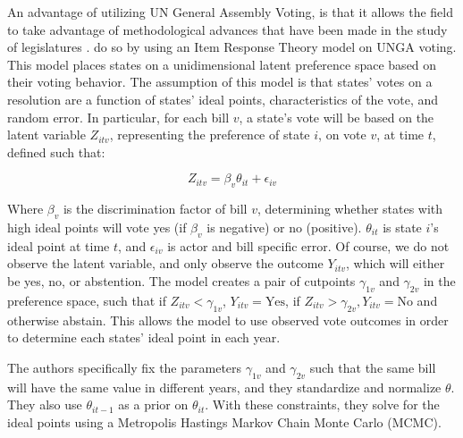 \documentclass[12pt,pdflatex]{elsarticle}
\begin{document}
An advantage of utilizing UN General Assembly Voting, is that it allows the field to take advantage of methodological advances that have been made in the study of legislatures \citep{poole:rosenthal:1985}. \citet{bailey:etal:2015} do so by using an Item Response Theory model on UNGA voting. This model places states on a unidimensional latent preference space based on their voting behavior. The assumption of this model is that states' votes on a resolution are a function of states' ideal points, characteristics of the vote, and random error. In particular, for each bill $v$, a state's vote will be based on the latent variable $Z_{itv}$, representing the preference of state $i$, on vote $v$, at time $t$, defined such that:

\begin{equation}
	Z_{itv} = \beta_{v}\theta_{it} + \epsilon_{iv}
\end{equation}

\noindent Where $\beta_{v}$ is the discrimination factor of bill $v$, determining whether states with high ideal points will vote yes (if $\beta_{v}$ is negative) or no (positive). $\theta_{it}$ is state $i$'s ideal point at time $t$, and $\epsilon_{iv}$ is actor and bill specific error. Of course, we do not observe the latent variable, and only observe the outcome $Y_{itv}$, which will either be yes, no, or abstention. The model creates a pair of cutpoints $\gamma_{1v}$ and $\gamma_{2v}$ in the preference space, such that  if $Z_{itv} < \gamma_{1v}$, $Y_{itv} = \text{Yes}$, if $Z_{itv} > \gamma_{2v}, Y_{itv} = \text{No}$ and otherwise abstain. This allows the model to use observed vote outcomes in order to determine each states' ideal point in each year.

The authors specifically fix the parameters $\gamma_{1v}$ and $\gamma_{2v}$ such that the same bill will have the same value in different years, and they standardize and normalize $\theta$. They also use $\theta_{it-1}$ as a prior on $\theta_{it}$. With these constraints, they solve for the ideal points using a Metropolis Hastings Markov Chain Monte Carlo (MCMC).
\end{document}
